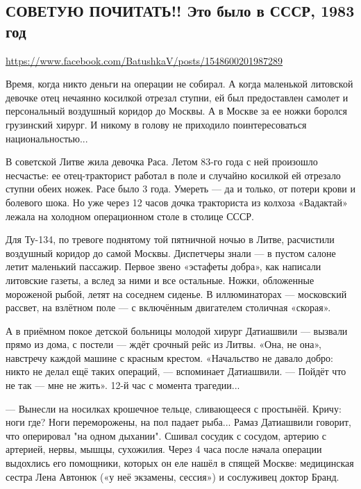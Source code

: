  
 

\subsection{СОВЕТУЮ ПОЧИТАТЬ!! Это было в СССР, 1983 год}

\url{https://www.facebook.com/BatushkaV/posts/1548600201987289}


Время, когда никто деньги на операции не собирал. А когда маленькой литовской
девочке отец нечаянно косилкой отрезал ступни, ей был предоставлен самолет и
персональный воздушный коридор до Москвы. А в Москве за ее ножки боролся
грузинский хирург. И никому в голову не приходило поинтересоваться
национальностью...

В советской Литве жила девочка Раса. Летом 83-го года с ней произошло
несчастье: ее отец-тракторист работал в поле и случайно косилкой ей отрезало
ступни обеих ножек. Расе было 3 года. Умереть — да и только, от потери крови и
болевого шока. Но уже через 12 часов дочка тракториста из колхоза «Вадактай»
лежала на холодном операционном столе в столице СССР.

Для Ту-134, по тревоге поднятому той пятничной ночью в Литве, расчистили
воздушный коридор до самой Москвы. Диспетчеры знали — в пустом салоне летит
маленький пассажир. Первое звено «эстафеты добра», как написали литовские
газеты, а вслед за ними и все остальные. Ножки, обложенные мороженой рыбой,
летят на соседнем сиденье. В иллюминаторах — московский рассвет, на взлётном
поле — с включённым двигателем столичная «скорая».

А в приёмном покое детской больницы молодой хирург Датиашвили — вызвали прямо
из дома, с постели — ждёт срочный рейс из Литвы. «Она, не она», навстречу
каждой машине с красным крестом. «Начальство не давало добро: никто не делал
ещё таких операций, — вспоминает Датиашвили. — Пойдёт что не так — мне не
жить». 12-й час с момента трагедии...

— Вынесли на носилках крошечное тельце, сливающееся с простынёй. Кричу: ноги
где? Ноги переморожены, на пол падает рыба... Рамаз Датиашвили говорит, что
оперировал "на одном дыхании". Сшивал сосудик с сосудом, артерию с артерией,
нервы, мышцы, сухожилия. Через 4 часа после начала операции выдохлись его
помощники, которых он еле нашёл в спящей Москве: медицинская сестра Лена
Автонюк («у неё экзамены, сессия») и сослуживец доктор Бранд.


